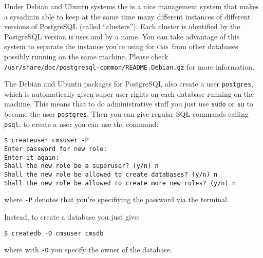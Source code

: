 \documentclass[a4paper,8pt]{amsart}
\newcommand{\CMS}{\textsc{cms}}
\newcommand{\id}[1]{\texttt{#1}}
\newcommand{\file}[1]{\texttt{#1}}
\begin{document}
\begin{multicols}{2}
  Under Debian and Ubuntu systems the is a nice management system that
  makes a sysadmin able to keep at the same time many different
  instances of different versions of PostgreSQL (called
  ``clusters''). Each cluster is identified by the PostgreSQL version
  is uses and by a name. You can take advantage of this system to
  separate the instance you're using for \CMS\ from other databases
  possibly running on the same machine. Please check
  \file{/usr/share/doc/postgresql-common/README.Debian.gz} for more
  information.

  The Debian and Ubuntu packages for PostgreSQL also create a user
  \id{postgres}, which is automatically given super user rights on
  each database running on the machine. This means that to do
  administrative stuff you just use \id{sudo} or \id{su} to became the
  user \id{postgres}. Then you can give regular SQL commands calling
  \file{psql}; to create a user you can use the command:
\begin{verbatim}
$ createuser cmsuser -P
Enter password for new role:
Enter it again:
Shall the new role be a superuser? (y/n) n
Shall the new role be allowed to create databases? (y/n) n
Shall the new role be allowed to create more new roles? (y/n) n
\end{verbatim}
  where \id{-P} denotes that you're specifiying the password via the
  terminal.

  Instead, to create a database you just give:
\begin{verbatim}
$ createdb -O cmsuser cmsdb
\end{verbatim}
  where with \id{-O} you specify the owner of the database.


\end{multicols}
\end{document}
